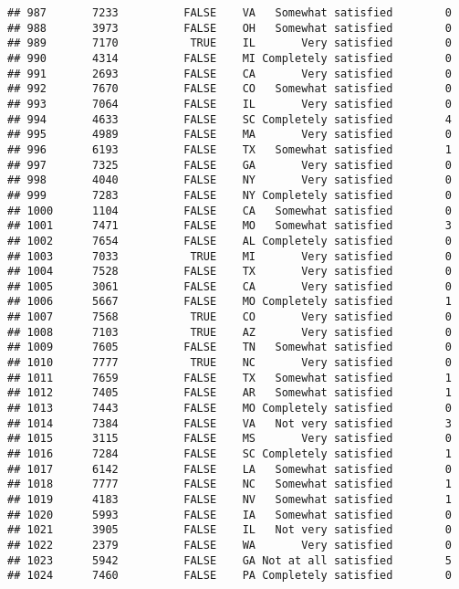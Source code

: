 \documentclass[]{book}
\theoremstyle{definition}
\theoremstyle{definition}
\theoremstyle{remark}
\begin{document}
\begin{verbatim}
## 987       7233          FALSE    VA   Somewhat satisfied        0
## 988       3973          FALSE    OH   Somewhat satisfied        0
## 989       7170           TRUE    IL       Very satisfied        0
## 990       4314          FALSE    MI Completely satisfied        0
## 991       2693          FALSE    CA       Very satisfied        0
## 992       7670          FALSE    CO   Somewhat satisfied        0
## 993       7064          FALSE    IL       Very satisfied        0
## 994       4633          FALSE    SC Completely satisfied        4
## 995       4989          FALSE    MA       Very satisfied        0
## 996       6193          FALSE    TX   Somewhat satisfied        1
## 997       7325          FALSE    GA       Very satisfied        0
## 998       4040          FALSE    NY       Very satisfied        0
## 999       7283          FALSE    NY Completely satisfied        0
## 1000      1104          FALSE    CA   Somewhat satisfied        0
## 1001      7471          FALSE    MO   Somewhat satisfied        3
## 1002      7654          FALSE    AL Completely satisfied        0
## 1003      7033           TRUE    MI       Very satisfied        0
## 1004      7528          FALSE    TX       Very satisfied        0
## 1005      3061          FALSE    CA       Very satisfied        0
## 1006      5667          FALSE    MO Completely satisfied        1
## 1007      7568           TRUE    CO       Very satisfied        0
## 1008      7103           TRUE    AZ       Very satisfied        0
## 1009      7605          FALSE    TN   Somewhat satisfied        0
## 1010      7777           TRUE    NC       Very satisfied        0
## 1011      7659          FALSE    TX   Somewhat satisfied        1
## 1012      7405          FALSE    AR   Somewhat satisfied        1
## 1013      7443          FALSE    MO Completely satisfied        0
## 1014      7384          FALSE    VA   Not very satisfied        3
## 1015      3115          FALSE    MS       Very satisfied        0
## 1016      7284          FALSE    SC Completely satisfied        1
## 1017      6142          FALSE    LA   Somewhat satisfied        0
## 1018      7777          FALSE    NC   Somewhat satisfied        1
## 1019      4183          FALSE    NV   Somewhat satisfied        1
## 1020      5993          FALSE    IA   Somewhat satisfied        0
## 1021      3905          FALSE    IL   Not very satisfied        0
## 1022      2379          FALSE    WA       Very satisfied        0
## 1023      5942          FALSE    GA Not at all satisfied        5
## 1024      7460          FALSE    PA Completely satisfied        0

\end{verbatim}
\end{document}
